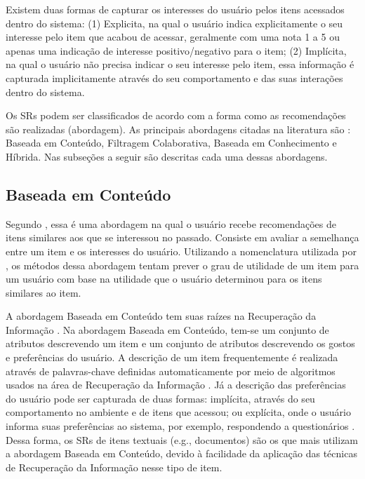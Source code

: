Existem duas formas de capturar os interesses do usuário pelos itens acessados dentro do sistema: (1) Explicita, na
qual o usuário indica explicitamente o seu interesse pelo item que acabou de acessar, geralmente com uma nota 1 a 5 ou
apenas uma indicação de interesse positivo/negativo para o item; (2) Implícita, na qual o usuário não precisa indicar o
seu interesse pelo item, essa informação é capturada implicitamente através do seu comportamento e das suas interações
dentro do sistema.

Os SRs podem ser classificados de acordo com a forma como as recomendações são realizadas (abordagem). As principais
abordagens citadas na literatura são \cite{torres2004personalizaccao, adomavicius2005toward, ricci2011introduction, bobadilla2013recommender}:
Baseada em Conteúdo, Filtragem Colaborativa, Baseada em Conhecimento e Híbrida. Nas subseções a seguir são descritas
cada uma dessas abordagens.

\subsection{Baseada em Conteúdo}\label{subsection:baseada-em-conteudo}

Segundo , essa é uma abordagem na qual o usuário recebe recomendações de itens
similares aos que se interessou no passado. Consiste em avaliar a semelhança entre um item e os interesses do usuário.
Utilizando a nomenclatura utilizada por , os métodos dessa abordagem tentam prever o
grau de utilidade de um item para um usuário com base na utilidade que o usuário determinou para os itens similares ao item.

A abordagem Baseada em Conteúdo tem suas raízes na Recuperação da Informação \cite{adomavicius2005toward}. Na
abordagem Baseada em Conteúdo, tem-se um conjunto de atributos descrevendo um item e um conjunto de atributos
descrevendo os gostos e preferências do usuário. A descrição de um item frequentemente é realizada através de
palavras-chave definidas automaticamente por meio de algoritmos usados na área de Recuperação da Informação
\cite{adomavicius2005toward}. Já a descrição das preferências do usuário pode ser capturada de duas formas: implícita,
através do seu comportamento no ambiente e de itens que acessou; ou explícita, onde o usuário informa suas preferências
ao sistema, por exemplo, respondendo a questionários \cite{adomavicius2005toward}. Dessa forma, os SRs de itens
textuais (e.g., documentos) são os que mais utilizam a abordagem Baseada em Conteúdo, devido à facilidade da aplicação
das técnicas de Recuperação da Informação nesse tipo de item.

